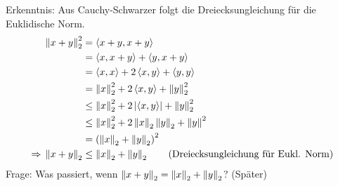 \begin{bemerkung}
    Erkenntnis: Aus Cauchy-Schwarzer folgt die Dreiecksungleichung für die Euklidische Norm.
    \begin{align*}
        \left\lVert x+y\right\rVert_2^2 &= \left<x+y,x+y\right>\\
        &= \left<x,x+y\right>+ \left<y,x+y\right>\\
        &= \left<x,x\right> + 2 \left<x,y\right> + \left<y,y\right>\\
        &= \left\lVert x\right\rVert_2^2 + 2\left<x,y\right> + \left\lVert y\right\rVert_2^2\\
        &\leq \left\lVert x\right\rVert_2^2 + 2\left\lvert\left<x,y\right>\right\rvert + \left\lVert y\right\rVert_2^2\\
        &\leq \left\lVert x\right\rVert_2^2 + 2\left\lVert x\right\rVert_2 \left\lVert y\right\rVert_2 + \left\lVert y\right\rVert^2\\
        &= \left(\left\lVert x\right\rVert_2 + \left\lVert y\right\rVert_2\right)^2\\
        \Rightarrow{} \left\lVert x+y\right\rVert_2 &\leq \left\lVert x\right\rVert_2 + \left\lVert y\right\rVert_2\tag{Dreiecksungleichung für Eukl. Norm}
    \end{align*}
    Frage: Was passiert, wenn $\left\lVert x+y\right\rVert_2 = \left\lVert x\right\rVert_2 + \left\lVert y\right\rVert_2$? (Später)
\end{bemerkung}

\newpage
